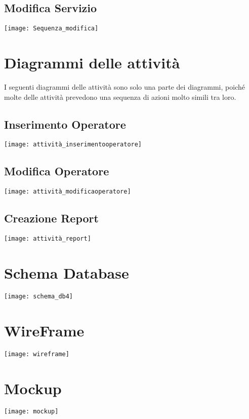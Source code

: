 \documentclass[green, fancy, 11pt]{elegantbook}
\begin{document}
\subsection{Modifica Servizio}
\noindent \texttt{[image: Sequenza\_modifica]}
\newpage

\section{Diagrammi delle attività}
\noindent  I seguenti diagrammi delle attività sono solo una parte dei diagrammi, poiché molte delle attività prevedono una sequenza di azioni molto simili tra loro.
{\center
\subsection{Inserimento Operatore}
\noindent \texttt{[image: attività\_inserimentooperatore]}
\newpage
\subsection{Modifica Operatore}
\noindent \texttt{[image: attività\_modificaoperatore]}
\newpage
\subsection{Creazione Report}
\noindent \texttt{[image: attività\_report]}
\newpage
}

\section{Schema Database}
\noindent \texttt{[image: schema\_db4]}

\newpage
\section{WireFrame}
\noindent \texttt{[image: wireframe]}

\newpage
\section{Mockup}
\noindent \texttt{[image: mockup]}
\end{document}
